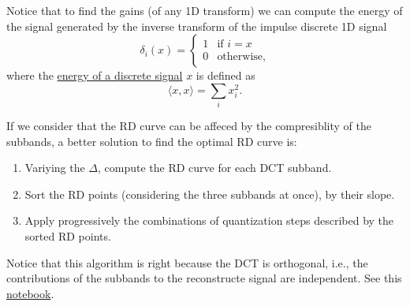 
Notice that to find the gains (of any 1D transform) we can compute the
energy of the signal generated by the inverse transform of the impulse
discrete 1D signal
\begin{equation}
  \delta_{i}(x) = 
  \left\{
  \begin{array}{ll}
    1 & \text{if $i=x$}\\
    0 & \text{otherwise},
  \end{array}
  \right.
\end{equation}
where the
\href{https://en.wikipedia.org/wiki/Energy_(signal_processing)}{energy
  of a discrete signal} $x$ is defined as
\begin{equation}
  \langle x, x\rangle =  \sum_{i}{x_i^2}.
\end{equation}

If we consider that the RD curve can be affeced by the compresiblity of the subbands, a better solution to find the optimal RD curve is:
\begin{enumerate}
\item Variying the $\Delta$, compute the RD curve for each DCT
  subband.
\item Sort the RD points (considering the three subbands at once), by
  their slope.
\item Apply progressively the combinations of quantization steps
  described by the sorted RD points.
\end{enumerate}
Notice that this algorithm is right because the DCT is orthogonal,
i.e., the contributions of the subbands to the reconstructe signal are
independent. See this \href{https://github.com/Sistemas-Multimedia/Sistemas-Multimedia.github.io/blob/master/study_guide/06-color_transform/color-DCT_compression.ipynb}{notebook}.



